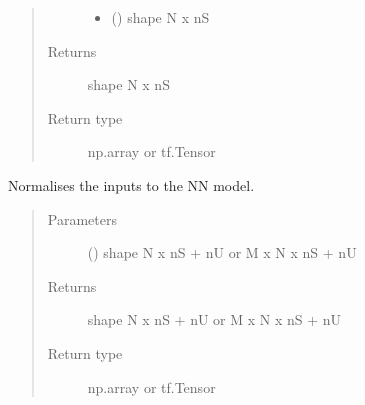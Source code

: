 \documentclass[letterpaper,10pt,english,openany,oneside]{sphinxmanual}
\begin{document}
\begin{fulllineitems}
\begin{fulllineitems}
\begin{quote}
\begin{description}
\begin{itemize}
\item {} 
 () \textendash{} shape N x nS

\end{itemize}

\item[{Returns}] \leavevmode
shape N x nS

\item[{Return type}] \leavevmode
np.array or tf.Tensor

\end{description}\end{quote}

\end{fulllineitems}


\begin{fulllineitems}
\label{\detokenize{_modules/utils:utils.ModelScaler.ModelScaler.transformInput}}
Normalises the inputs to the NN model.
\begin{quote}\begin{description}
\item[{Parameters}] \leavevmode
{} () \textendash{} shape N x nS + nU or M x N x nS + nU

\item[{Returns}] \leavevmode
shape N x nS + nU or M x N x nS + nU

\item[{Return type}] \leavevmode
np.array or tf.Tensor

\end{description}\end{quote}

\end{fulllineitems}



\end{fulllineitems}
\end{document}
